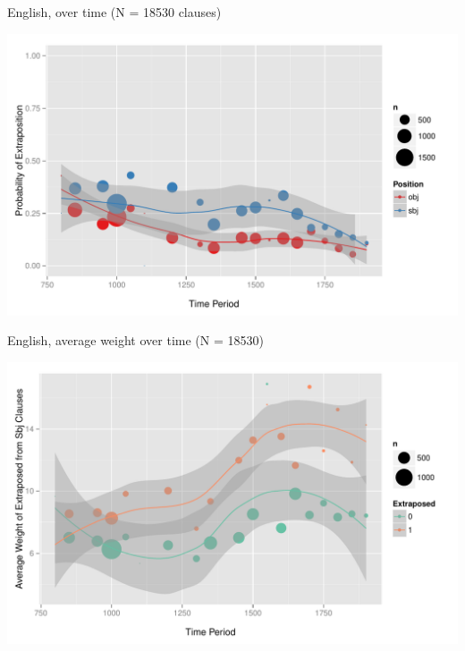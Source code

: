 \documentclass[hyperref={pdfpagelabels=false}]{beamer}
\begin{document}
\begin{frame}{English, over time (N = 18530 clauses)}

\begin{center}
\includegraphics[width=1.1\textwidth]{exSbjObjYearBinned50Loessymeb.pdf}
\end{center}
\end{frame}



\begin{frame}{English, average weight over time (N = 18530)}

\begin{center}
\includegraphics[width=1.1\textwidth]{exWeightYearBinned50Loessymeb.pdf}
\end{center}
\end{frame}
\end{document}
